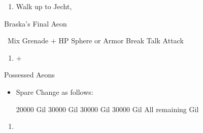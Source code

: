 	\begin{enumerate}[resume]
		\item Walk up to Jecht, \cs[4:30]
	\end{enumerate}
	\bothvfill\winvfill\lossvfill
	\begin{battle}[180000]{Braska's Final Aeon}
		\begin{itemize}
			\switch{\yuna}{\rikku}
			\rikkuf \od\ Mix Grenade + HP Sphere or Armor Break
			\tidusf Talk
			\switch{\auron}{\yuna}
			\summon{\bahamut}
			\bahamutf Attack
		\end{itemize}
	\end{battle}
\colend
\begin{enumerate}[resume]
	\item \cs+\skippablefmv[4:00]
\end{enumerate}
\begin{battle}{Possessed Aeons}
	\begin{itemize}
		\item Spare Change as follows:
			\begin{itemize}
				\valeforf \num{20000} Gil
				\ifritf \num{30000} Gil
				\ixionf \num{30000} Gil
				\shivaf \num{30000} Gil
				\bahamutf All remaining Gil
			\end{itemize}
	\end{itemize}
\end{battle}
\begin{enumerate}[resume]
	\item \cs[1:40]
\end{enumerate}
